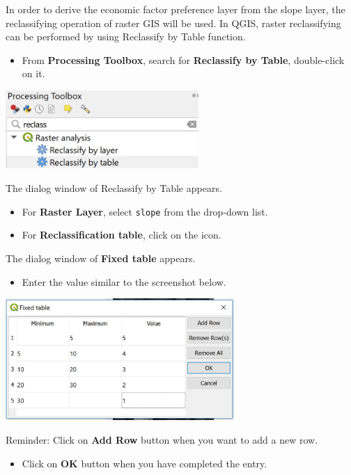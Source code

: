 \documentclass[
  letterpaper,
  DIV=11,
  numbers=noendperiod]{scrreprt}
\providecommand{\tightlist}{%
  \setlength{\itemsep}{0pt}\setlength{\parskip}{0pt}}\usepackage{longtable,booktabs,array}
\begin{document}
In order to derive the economic factor preference layer from the slope
layer, the reclassifying operation of raster GIS will be used. In QGIS,
raster reclassifying can be performed by using Reclassify by Table
function.

\begin{itemize}
\tightlist
\item
  From \textbf{Processing Toolbox}, search for \textbf{Reclassify by
  Table}, double-click on it.
\end{itemize}

\includegraphics[width=0.55\textwidth,height=\textheight]{./img08/image1.jpg}

The dialog window of Reclassify by Table appears.

\begin{itemize}
\tightlist
\item
  For \textbf{Raster Layer}, select \texttt{slope} from the drop-down
  list.
\item
  For \textbf{Reclassification table}, click on the icon.
\end{itemize}

The dialog window of \textbf{Fixed table} appears.

\begin{itemize}
\tightlist
\item
  Enter the value similar to the screenshot below.
\end{itemize}

\includegraphics[width=0.65\textwidth,height=\textheight]{./img08/image2.jpg}

Reminder: Click on \textbf{Add Row} button when you want to add a new
row.

\begin{itemize}
\tightlist
\item
  Click on \textbf{OK} button when you have completed the entry.
\end{itemize}
\end{document}
